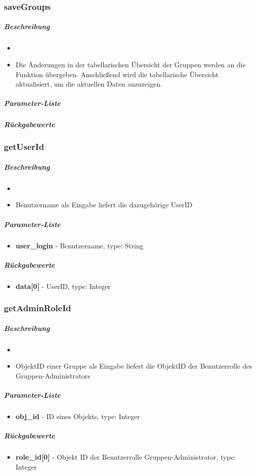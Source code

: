 \subsubsection*{saveGroups}\label{saveGroupsGDGUI}
\subparagraph{Beschreibung}
\begin{itemize}
	\item[]  \noindent{} 
	\item[] Die Änderungen in der tabellarischen Übersicht der Gruppen werden an die Funktion  übergeben. Anschließend wird die tabellarische Übersicht aktualisiert, um die aktuellen Daten anzuzeigen.
\end{itemize}
\subparagraph{Parameter-Liste}
\subparagraph{Rückgabewerte}

\subsubsection*{getUserId}\label{getUserIdGDGUI}
\subparagraph{Beschreibung}
\begin{itemize}
	\item[]  \noindent{} 
	\item[] Benutzername als Eingabe liefert die dazugehörige UserID
\end{itemize}
\subparagraph{Parameter-Liste}
\begin{itemize}
	\item[] \textbf{user\_login} - Benutzername, type: String
\end{itemize}
\subparagraph{Rückgabewerte}
\begin{itemize}
	\item[] \textbf{data[0]} - UserID, type: Integer
\end{itemize}

\subsubsection*{getAdminRoleId}\label{getAdminRoleIdGDGUI}
\subparagraph{Beschreibung}
\begin{itemize}
	\item[]  \noindent{} 
	\item[] ObjektID einer Gruppe als Eingabe liefert die ObjektID der Benutzerrolle des Gruppen-Administrators
\end{itemize}
\subparagraph{Parameter-Liste}
\begin{itemize}
	\item[] \textbf{obj\_id} - ID eines Objekts, type: Integer
\end{itemize}
\subparagraph{Rückgabewerte}
\begin{itemize}
	\item[] \textbf{role\_id[0]} - Objekt ID der Benutzerrolle Gruppen-Administrator, type: Integer
\end{itemize}

